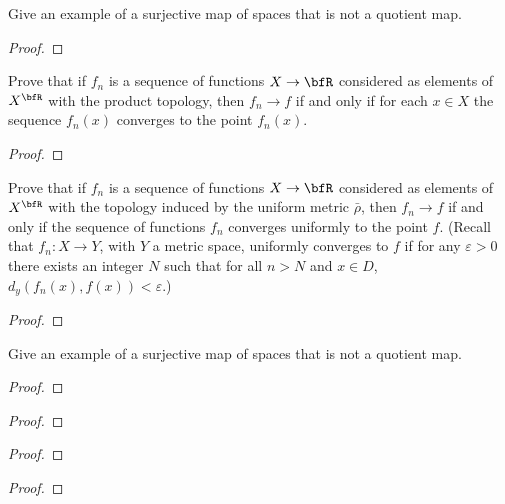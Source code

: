\begin{problem}
Give an example of a surjective map of spaces that is not a quotient map.
\end{problem}
\begin{proof}
\end{proof}

\begin{problem}
Prove that if $f_n$ is a sequence of functions $X\to\bfR$ considered as
elements of $X^{\bfR}$ with the product topology, then $f_n\to f$ if and
only if for each $x\in X$ the sequence $f_n(x)$ converges to the point
$f_n(x)$.
\end{problem}
\begin{proof}
\end{proof}

\begin{problem}
Prove that if $f_n$ is a sequence of functions $X\to\bfR$ considered as
elements of $X^{\bfR}$ with the topology induced by the uniform metric
$\bar\rho$, then $f_n\to f$ if and only if the sequence of functions
$f_n$ converges uniformly to the point $f$. (Recall that $f_n\colon X\to
Y$, with $Y$ a metric space, uniformly converges to $f$ if for any
$\varepsilon>0$ there exists an integer $N$ such that for all $n>N$ and
$x\in D$, $d_y(f_n(x),f(x))<\varepsilon$.)
\end{problem}
\begin{proof}
\end{proof}

\begin{problem}
Give an example of a surjective map of spaces that is not a quotient map.
\end{problem}
\begin{proof}
\end{proof}

\begin{problem}
\end{problem}
\begin{proof}
\end{proof}

\begin{problem}
\end{problem}
\begin{proof}
\end{proof}

\begin{problem}
\end{problem}
\begin{proof}
\end{proof}

